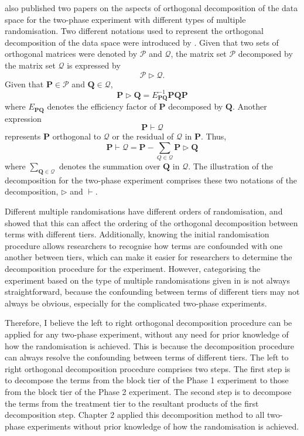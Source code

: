 \documentclass[11pt,a4paper]{article}
\begin{document}
\cite{Brien2009, Brien2010} also published two papers on the aspects of orthogonal decomposition of the data space for the two-phase experiment with different types of multiple randomisation. Two different notations used to represent the orthogonal decomposition of the data space were introduced by \cite{Brien2009}. Given that two sets of orthogonal matrices were denoted by $\mathcal{P}$ and $\mathcal{Q}$, the matrix set $\mathcal{P}$ decomposed by the matrix set $\mathcal{Q}$ is expressed by
\begin{equation}
\mathcal{P} \rhd \mathcal{Q}.
\end{equation}
Given that $\mathbf{P} \in \mathcal{P}$ and $\mathbf{Q} \in \mathcal{Q}$, 
\begin{equation}
\mathbf{P} \rhd \mathbf{Q} =  E_{\mathbf {PQ}}^{-1}\mathbf{PQP}
\end{equation}
where $ E_{\mathbf {PQ}}$ denotes the efficiency factor of $\mathbf{P}$ decomposed by $\mathbf{Q}$. Another expression 
\begin{equation}
\mathbf{P} \vdash \mathcal{Q}
\end{equation}
represents $\mathbf{P}$ orthogonal to $ \mathcal{Q}$ or the residual of $\mathcal{Q}$ in $\mathbf{P}$. Thus, 
\begin{equation}
\mathbf{P} \vdash  \mathcal{Q} = \mathbf{P} - \sum_{Q \in \mathcal{Q}} \mathbf{P} \rhd \mathbf{Q}
\end{equation} 
where $\sum_{\mathbf{Q} \in \mathcal{Q}}$ denotes the summation over $\mathbf{Q}$ in $\mathcal{Q}$. The illustration of the decomposition for the two-phase experiment comprises these two notations of the decomposition, $\rhd $ and $\vdash$. 

Different multiple randomisations have different orders of randomisation, and \cite{Brien2009, Brien2010} showed that this can affect the ordering of the orthogonal decomposition between terms with different tiers. Additionally, knowing the initial randomisation procedure allows researchers to recognise how terms are confounded with one another between tiers, which can make it easier for researchers to determine the decomposition procedure for the experiment. However, categorising the experiment based on the type of multiple randomisations given in \cite{Brien2006b} is not always straightforward, because the confounding between terms of different tiers may not always be obvious, especially for the complicated two-phase experiments. 

Therefore, I believe the left to right orthogonal decomposition procedure can be applied for any two-phase experiment, without any need for prior knowledge of how the randomisation is achieved. This is because the decomposition procedure can always resolve the confounding between terms of different tiers. The left to right orthogonal decomposition procedure comprises two steps. The first step is to decompose the terms from the block tier of the Phase 1 experiment to those from the block tier of the Phase 2 experiment. The second step is to decompose the terms from the treatment tier to the resultant products of the first decomposition step. Chapter 2 applied this decomposition method to all two-phase experiments without prior knowledge of how the randomisation is achieved. 
\end{document}
